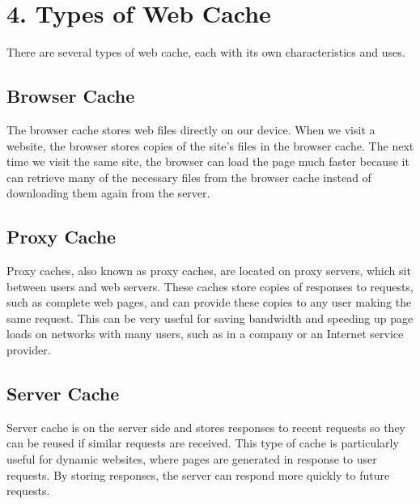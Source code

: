 \documentclass[12pt]{article}
\begin{document}
\citep*{Solutions}

\section*{4. Types of Web Cache}
There are several types of web cache, each with its own characteristics and uses.

\subsection*{Browser Cache}
The browser cache stores web files directly on our device. When we visit a website, the browser stores copies of the site's files in the browser cache. The next time we visit the same site, the browser can load the page much faster because it can retrieve many of the necessary files from the browser cache instead of downloading them again from the server.

\subsection*{Proxy Cache}
Proxy caches, also known as proxy caches, are located on proxy servers, which sit between users and web servers. These caches store copies of responses to requests, such as complete web pages, and can provide these copies to any user making the same request. This can be very useful for saving bandwidth and speeding up page loads on networks with many users, such as in a company or an Internet service provider.

\subsection*{Server Cache}
Server cache is on the server side and stores responses to recent requests so they can be reused if similar requests are received. This type of cache is particularly useful for dynamic websites, where pages are generated in response to user requests. By storing responses, the server can respond more quickly to future requests.

\citep*{Solutions}
     
\end{document}
